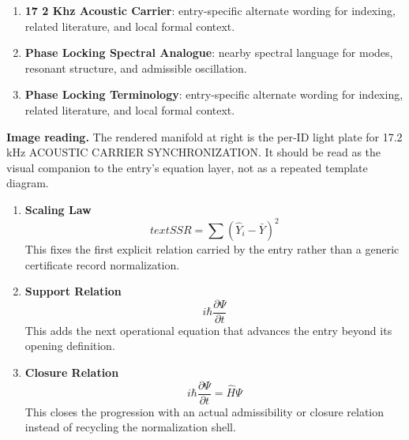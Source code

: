 \begin{enumerate}[leftmargin=1.6em,itemsep=6pt,topsep=4pt]
\item \textbf{17 2 Khz Acoustic Carrier}: entry-specific alternate wording for indexing, related literature, and local formal context.
\item \textbf{Phase Locking Spectral Analogue}: nearby spectral language for modes, resonant structure, and admissible oscillation.
\item \textbf{Phase Locking Terminology}: entry-specific alternate wording for indexing, related literature, and local formal context.
\end{enumerate}

\begin{samepage}
\noindent\begin{minipage}[t]{0.45\linewidth}
\vspace{0pt}
\raggedright
\scriptsize\textbf{Image reading.} The rendered manifold at right is the per-ID light plate for 17.2 kHz ACOUSTIC CARRIER SYNCHRONIZATION. It should be read as the visual companion to the entry's equation layer, not as a repeated template diagram.\par
\end{minipage}\hfill
\begin{minipage}[t]{0.53\linewidth}
\vspace*{-0.10in}
\raggedright
{}
\end{minipage}
\end{samepage}

\clearpage


\begin{enumerate}[leftmargin=1.6em,itemsep=9pt,topsep=6pt]
\item \textbf{Scaling Law}
\[
text{SSR} = \sum (\hat{Y}_i - \bar{Y})^2
\]
This fixes the first explicit relation carried by the entry rather than a generic certificate record normalization.

\item \textbf{Support Relation}
\[
i\hbar \frac{\partial \Psi}{\partial t}
\]
This adds the next operational equation that advances the entry beyond its opening definition.

\item \textbf{Closure Relation}
\[
i\hbar \frac{\partial \Psi}{\partial t} = \hat{H} \Psi
\]
This closes the progression with an actual admissibility or closure relation instead of recycling the normalization shell.
\end{enumerate}

